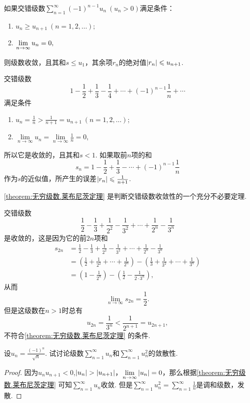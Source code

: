 \begin{theorem}[莱布尼茨定理]\label{theorem:无穷级数.莱布尼茨定理}
如果交错级数\(\sum\limits_{n=1}^{\infty} (-1)^{n-1} u_n\ (u_n>0)\)满足条件：
\begin{enumerate}
\item \(u_n \geqslant u_{n+1}\ (n=1,2,\dotsc);\)
\item \(\l {u_n}=0,\)
\end{enumerate}
则级数收敛，且其和\(s \leqslant u_1\)，其余项\(r_n\)的绝对值\(\abs{r_n} \leqslant u_{n+1}\).
\end{theorem}

\begin{example}\label{example:无穷级数.交错级数1}
交错级数\[
1 - \frac{1}{2} + \frac{1}{3} - \frac{1}{4} + \dotsb + (-1)^{n-1} \frac{1}{n} + \dotsb
\]满足条件\begin{enumerate}
\item \(u_n = \frac{1}{n} > \frac{1}{n+1} = u_{n+1}\ (n=1,2,\dotsc)\);
\item \(\lim\limits_{n\to\infty} u_n = \lim\limits_{n\to\infty} \frac{1}{n} = 0\),
\end{enumerate}所以它是收敛的，且其和\(s < 1\).
如果取前\(n\)项的和\[
s_n = 1 - \frac{1}{2} + \frac{1}{3} - \dotsb + (-1)^{n-1} \frac{1}{n}
\]作为\(s\)的近似值，所产生的误差\(\abs{r_n} \leqslant \frac{1}{n+1}\).
\end{example}

\cref{theorem:无穷级数.莱布尼茨定理} 是判断交错级数收敛性的一个充分不必要定理.
\begin{example}
交错级数\[
\frac{1}{2} - \frac{1}{3}
+ \frac{1}{2^2} - \frac{1}{3^2}
+ \dotsm + \frac{1}{2^n} - \frac{1}{3^n}
\]是收敛的，这是因为它的前\(2n\)项和\begin{align*}
s_{2n} &= \frac{1}{2} - \frac{1}{3}
+ \frac{1}{2^2} - \frac{1}{3^2}
+ \dotsm + \frac{1}{2^n} - \frac{1}{3^n} \\
&= \left(\frac{1}{2} + \frac{1}{2^2} + \dotsm + \frac{1}{2^n}\right)
 - \left(\frac{1}{3} + \frac{1}{3^2} + \dotsm + \frac{1}{3^n}\right) \\
&= \left(1 - \frac{1}{2^n}\right)
 - \left(\frac{1}{2} - \frac{1}{2\cdot3^n}\right),
\end{align*}从而\[
\lim\limits_{n\to\infty} s_{2n} = \frac{1}{2}.
\]但是这级数在\(n>1\)时总有\[
u_{2n} = \frac{1}{3^n} < \frac{1}{2^{n+1}} = u_{2n+1},
\]不符合\cref{theorem:无穷级数.莱布尼茨定理} 的条件.
\end{example}

\begin{example}
\def\s{\sum\limits_{n=1}^{\infty}}%
\def\l{\lim\limits_{n\to\infty}}%
设\(u_n = \frac{(-1)^n}{\sqrt{n}}\).
试讨论级数\(\s u_n\)和\(\s u_n^2\)的敛散性.
\begin{proof}
因为\(u_n u_{n+1} < 0\),\(\abs{u_n} > \abs{u_{n+1}}\)，\(\l \abs{u_n} = 0\)，那么根据\cref{theorem:无穷级数.莱布尼茨定理} 可知\(\s u_n\)收敛.
但是\(\s u_n^2 = \s \frac{1}{n}\)是调和级数，发散.
\end{proof}
\end{example}

